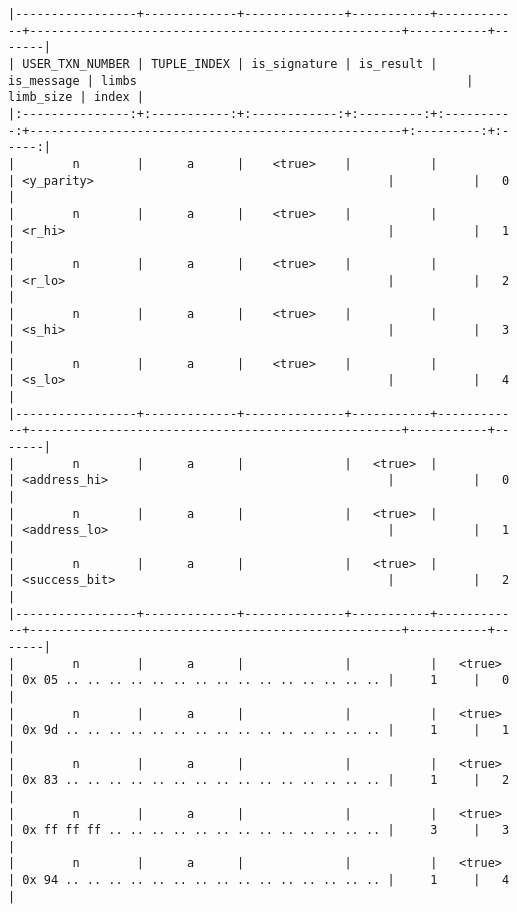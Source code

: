 \documentclass[varwidth=\maxdimen,margin=0.5cm,multi={verbatim}]{standalone}
\begin{document}
\begin{verbatim}
|-----------------+-------------+--------------+-----------+------------+----------------------------------------------------+-----------+-------|
| USER_TXN_NUMBER | TUPLE_INDEX | is_signature | is_result | is_message | limbs                                              | limb_size | index |
|:---------------:+:-----------:+:------------:+:---------:+:----------:+----------------------------------------------------+:---------:+:-----:|
|        n        |      a      |    <true>    |           |            | <y_parity>                                         |           |   0   |
|        n        |      a      |    <true>    |           |            | <r_hi>                                             |           |   1   |
|        n        |      a      |    <true>    |           |            | <r_lo>                                             |           |   2   |
|        n        |      a      |    <true>    |           |            | <s_hi>                                             |           |   3   |
|        n        |      a      |    <true>    |           |            | <s_lo>                                             |           |   4   |
|-----------------+-------------+--------------+-----------+------------+----------------------------------------------------+-----------+-------|
|        n        |      a      |              |   <true>  |            | <address_hi>                                       |           |   0   |
|        n        |      a      |              |   <true>  |            | <address_lo>                                       |           |   1   |
|        n        |      a      |              |   <true>  |            | <success_bit>                                      |           |   2   |
|-----------------+-------------+--------------+-----------+------------+----------------------------------------------------+-----------+-------|
|        n        |      a      |              |           |   <true>   | 0x 05 .. .. .. .. .. .. .. .. .. .. .. .. .. .. .. |     1     |   0   |
|        n        |      a      |              |           |   <true>   | 0x 9d .. .. .. .. .. .. .. .. .. .. .. .. .. .. .. |     1     |   1   |
|        n        |      a      |              |           |   <true>   | 0x 83 .. .. .. .. .. .. .. .. .. .. .. .. .. .. .. |     1     |   2   |
|        n        |      a      |              |           |   <true>   | 0x ff ff ff .. .. .. .. .. .. .. .. .. .. .. .. .. |     3     |   3   |
|        n        |      a      |              |           |   <true>   | 0x 94 .. .. .. .. .. .. .. .. .. .. .. .. .. .. .. |     1     |   4   |

\end{verbatim}
\end{document}
